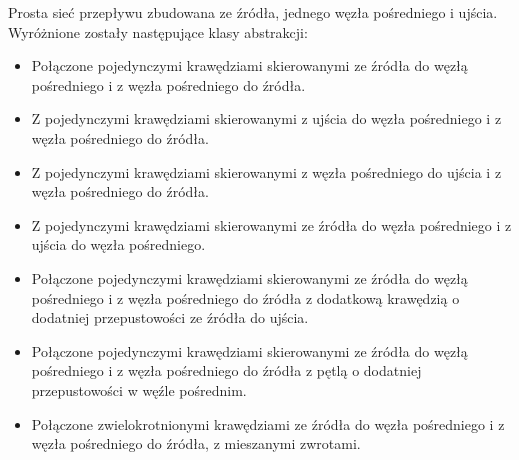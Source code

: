 \documentclass[10pt]{dokument-tiwo}
\begin{document}
Prosta sieć przepływu zbudowana ze źródła, jednego węzła pośredniego i ujścia. Wyróżnione zostały następujące klasy abstrakcji:
\begin{itemize}

    \item Połączone pojedynczymi krawędziami skierowanymi ze źródła do węzłą pośredniego i z węzła pośredniego do źródła.
    \item Z pojedynczymi krawędziami skierowanymi z ujścia do węzła pośredniego i z węzła pośredniego do źródła.
    \item Z pojedynczymi krawędziami skierowanymi z węzła pośredniego do ujścia i z węzła pośredniego do źródła.
    \item Z pojedynczymi krawędziami skierowanymi ze źródła do węzła pośredniego i z ujścia do węzła pośredniego.
    \item Połączone pojedynczymi krawędziami skierowanymi ze źródła do węzłą pośredniego i z węzła pośredniego do źródła z dodatkową krawędzią o dodatniej przepustowości ze źródła do ujścia.
    \item Połączone pojedynczymi krawędziami skierowanymi ze źródła do węzłą pośredniego i z węzła pośredniego do źródła z pętlą o dodatniej przepustowości w węźle pośrednim.
    \item Połączone zwielokrotnionymi krawędziami ze źródła do węzła pośredniego i z węzła pośredniego do źródła, z mieszanymi zwrotami.
\end{itemize}
\end{document}
